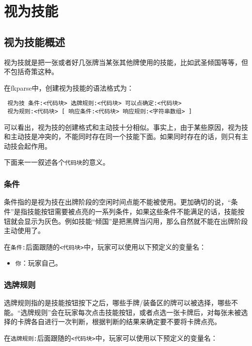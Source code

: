\chapter{视为技能}

\section{视为技能概述}

视为技就是把一张或者好几张牌当某张其他牌使用的技能，比如武圣倾国等等，但不包括奇策这种。

在fkparse中，创建视为技能的语法格式为：

\begin{verbatim}
 视为技 条件:<代码块> 选牌规则:<代码块> 可以点确定:<代码块>
 视为规则:<代码块> [ 响应条件:<代码块> 响应规则:<字符串数组> ]
\end{verbatim}

可以看出，视为技的创建格式和主动技十分相似。事实上，由于某些原因，视为技和主动技是冲突的，不能同时存在同一个技能下面。如果同时存在的话，则只有主动技会起作用。

下面来一一叙述各个\verb|代码块|的意义。

\subsection{条件}

条件指的是视为技在出牌阶段的空闲时间点能不能被使用。更加确切的说，“条件”是指技能按钮需要被点亮的一系列条件，如果这些条件不能满足的话，技能按钮就会显示为灰色。例如技能“倾国”是把黑牌当闪用，那么自然就不能在出牌阶段主动使用了。

在\verb|条件:|后面跟随的\verb|<代码块>|中，玩家可以使用以下预定义的变量名：

\begin{itemize}
 \item \verb|你|：玩家自己。
\end{itemize}

\subsection{选牌规则}

选牌规则指的是技能按钮按下之后，哪些手牌/装备区的牌可以被选择，哪些不能。“选牌规则”会在玩家每次点击技能按钮，或者点选一张卡牌后，对每张未被选择的卡牌各自进行一次判断，根据判断的结果来确定要不要将卡牌点亮。

在\verb|选牌规则:|后面跟随的\verb|<代码块>|中，玩家可以使用以下预定义的变量名：

